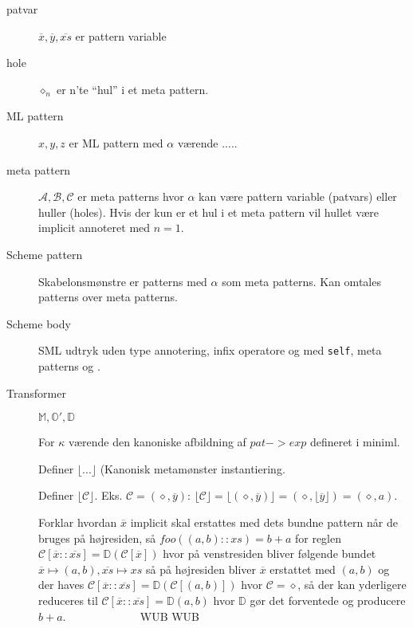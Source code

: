 \documentclass[oneside]{memoir}
\newcommand{\floor}[1]{\ensuremath{\lfloor #1 \rfloor}}
\theoremstyle{definition}
\begin{document}
\begin{description}
\item[patvar] $\overline{x}, \overline{y}, \overline{xs}$ er pattern variable

\item[hole] $\diamond_n$ er n'te "`hul"' i et meta pattern.


\item[ML pattern] $x,y,z$ er ML pattern med $\alpha$ værende .....


\item[meta pattern] $\mathcal{A}, \mathcal{B}, \mathcal{C}$ er meta patterns
  hvor $\alpha$ kan være pattern variable (patvars) eller huller (holes). Hvis
  der kun er et hul i et meta pattern vil hullet være implicit annoteret med
  $n=1$.

\item[Scheme pattern] Skabelonsmønstre er patterns med $\alpha$ som meta
  patterns. Kan omtales patterns over meta patterns.


\item[Scheme body] SML udtryk uden type annotering, infix operatore og med
  \texttt{self}, meta patterns og .


\item[Transformer] $\mathbb{M}, \mathbb{O}', \mathbb{D}$


For $\kappa$ værende den kanoniske afbildning af $pat -> exp$ defineret i
miniml.

Definer $\floor{...}$ (Kanonisk metamønster instantiering.

Definer $\floor{\mathcal{C}}$. Eks. $\mathcal{C} = (\diamond, \overline{y})$:
$\floor{\mathcal{C}} = \floor{(\diamond, \overline{y})} = (\diamond,
\floor{\overline{y}}) = (\diamond, a)$.

Forklar hvordan $\overline{x}$ implicit skal erstattes med dets bundne pattern når
de bruges på højresiden, så $foo((a,b)::xs) = b+a$ for reglen $\mathcal{C}
[\overline{x}::\overline{xs}] = \mathbb{D}(\mathcal{C}[\overline{x}])$ hvor på venstresiden
bliver følgende bundet $\overline{x} \mapsto (a,b), \overline{xs} \mapsto xs$ så
på højresiden bliver $\overline{x}$ erstattet med $(a,b)$ og der haves $\mathcal{C}
[\overline{x}::\overline{xs}] = \mathbb{D}(\mathcal{C}[(a,b)])$ hvor
$\mathcal{C} = \diamond$, så der kan yderligere reduceres til $\mathcal{C}
[\overline{x}::\overline{xs}] = \mathbb{D}(a,b)$ hvor $\mathbb{D}$ gør det
forventede og producere $b+a$. ~~~~~~~~~~~~ WUB WUB
\end{description}
\end{document}
